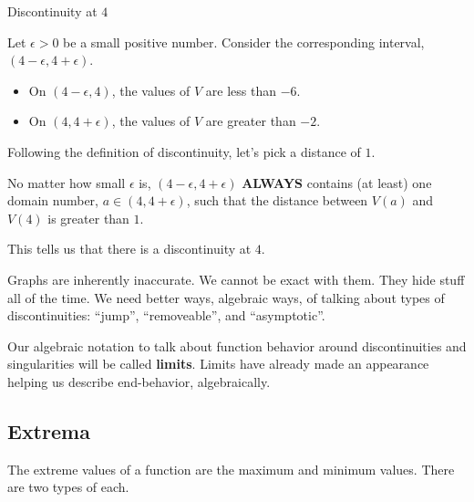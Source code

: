 \documentclass{ximera}
\begin{document}
\begin{explanation} Discontinuity at $4$


Let $\epsilon > 0$ be a small positive number.  Consider the corresponding interval, $(4 - \epsilon, 4 + \epsilon)$.

\begin{itemize}
\item On $(4 - \epsilon, 4)$, the values of $V$ are less than $-6$.
\item On $(4, 4 + \epsilon)$, the values of $V$ are greater than $-2$.
\end{itemize}


Following the definition of discontinuity, let's pick a distance of $1$.


No matter how small $\epsilon$ is, $(4 - \epsilon, 4 + \epsilon)$ \textbf{\textcolor{red!90!darkgray}{ALWAYS}} contains (at least) one domain number, $a \in (4, 4 + \epsilon)$, such that the distance between $V(a)$ and $V(4)$ is greater than $1$.

This tells us that there is a discontinuity at $4$.

\end{explanation}




\begin{notation}


Graphs are inherently inaccurate.  We cannot be exact with them.  They hide stuff all of the time. We need better ways, algebraic ways, of talking about types of discontinuities: ``jump'', ``removeable'', and ``asymptotic''.

Our algebraic notation to talk about function behavior around discontinuities and singularities will be called \textbf{\textcolor{purple!85!blue}{limits}}.  Limits have already made an appearance helping us describe end-behavior, algebraically.
\end{notation}














\subsection{Extrema}


The extreme values of a function are the maximum and minimum values.  There are two types of each. \\
\end{document}
